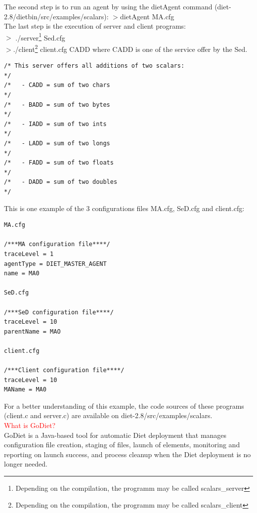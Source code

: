 \documentclass[12pt,a4paper]{book}
\newcommand{\dietversion}{2.8}
\begin{document}
\noindent The second step is to run an agent by using the dietAgent command (diet-\dietversion/dietbin/src/examples/scalars):
$>$dietAgent MA.cfg\\
\noindent The last step is the execution of server and client programs:\\
$>$ ./server\footnote{Depending on the compilation, the programm may be called scalars\_server} Sed.cfg\\
$>$./client\footnote{Depending on the compilation, the programm may be called scalars\_client} client.cfg CADD where CADD is one of the service offer by the Sed.
\begin{verbatim}
/* This server offers all additions of two scalars:                  */
/*   - CADD = sum of two chars                                       */
/*   - BADD = sum of two bytes                                       */
/*   - IADD = sum of two ints                                        */
/*   - LADD = sum of two longs                                       */
/*   - FADD = sum of two floats                                      */
/*   - DADD = sum of two doubles                                     */
\end{verbatim}

\noindent This is one example of the 3 configurations files MA.cfg, SeD.cfg and client.cfg:

\begin{verbatim}
MA.cfg

/***MA configuration file****/
traceLevel = 1
agentType = DIET_MASTER_AGENT
name = MA0

SeD.cfg

/***SeD configuration file****/
traceLevel = 10
parentName = MAO

client.cfg

/***Client configuration file****/
traceLevel = 10
MAName = MA0
\end{verbatim}

\noindent For a better understanding of this example, the code sources of these programs (client.c and server.c) are available on diet-\dietversion/src/examples/scalars.\\

\noindent \textcolor{red}{What is GoDiet?}\\
GoDiet is a Java-based tool for automatic Diet deployment that manages configuration file creation, staging of files, launch of elements, monitoring and reporting on launch
success, and process cleanup when the Diet deployment is no longer needed.\\
\end{document}
